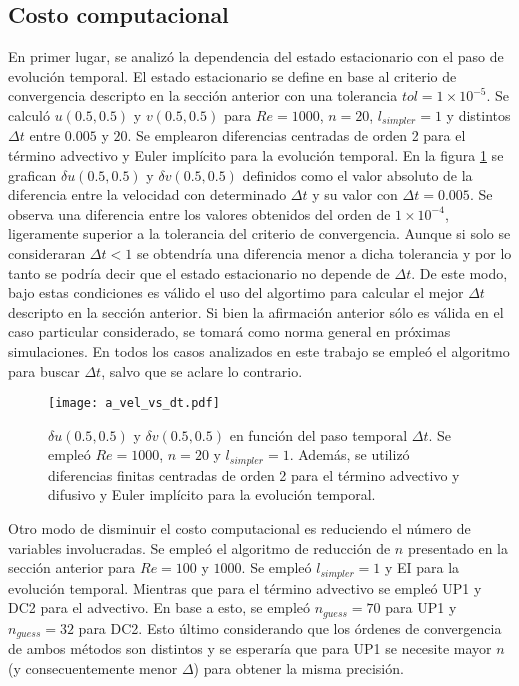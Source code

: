 \documentclass[aps,prb,twocolumn,superscriptaddress,floatfix,longbibliography,10pt]{revtex4-2}
\newif\ifptitle
\newif\ifpnumber
\newcounter{para}
\newcommand\ptitle[1]{\par\refstepcounter{para}
{\ifpnumber{\noindent\textcolor{lightgray}{\textbf{\thepara}}\indent}\fi}
{\ifptitle{\textbf{[{#1}]}}\fi}}
\begin{document}
\subsection{Costo computacional}

En primer lugar, se analizó la dependencia del estado estacionario con el paso de evolución temporal. El estado estacionario se define en base al criterio de convergencia descripto en la sección anterior con una tolerancia $tol = 1 \times 10^{-5}$. Se calculó $u(0.5,0.5)$ y $v(0.5,0.5)$ para $Re = 1000$, $n = 20$, $l_{simpler} = 1$ y distintos $\Delta t$ entre $0.005$ y $20$. Se emplearon diferencias centradas de orden 2 para el término advectivo y Euler implícito para la evolución temporal. En la figura \ref{fig:a_vel_vs_dt} se grafican $\delta u(0.5,0.5)$ y $\delta v(0.5,0.5)$ definidos como el valor absoluto de la diferencia entre la velocidad con determinado $\Delta t$ y su valor con $\Delta t = 0.005$. Se observa una diferencia entre los valores obtenidos del orden de $1 \times 10^{-4}$, ligeramente superior a la tolerancia del criterio de convergencia. Aunque si solo se consideraran $\Delta t < 1$ se obtendría una diferencia menor a dicha tolerancia y por lo tanto se podría decir que el estado estacionario no depende de $\Delta t$. De este modo, bajo estas condiciones es válido el uso del algortimo para calcular el mejor $\Delta t$ descripto en la sección anterior. Si bien la afirmación anterior sólo es válida en el caso particular considerado, se tomará como norma general en próximas simulaciones. En todos los casos analizados en este trabajo se empleó el algoritmo para buscar $\Delta t$, salvo que se aclare lo contrario.

\begin{figure}[h]
  \texttt{[image: a\_vel\_vs\_dt.pdf]}
  \caption{$\delta u(0.5,0.5)$ y $\delta v(0.5,0.5)$ en función del paso temporal $\Delta t$. Se empleó $Re = 1000$, $n = 20$ y $l_{simpler} = 1$. Además, se utilizó diferencias finitas centradas de orden 2 para el término advectivo y difusivo y Euler implícito para la evolución temporal.}
   \label{fig:a_vel_vs_dt}
\end{figure}

\ptitle{Resumen}
Otro modo de disminuir el costo computacional es reduciendo el número de variables involucradas. Se empleó el algoritmo de reducción de $n$ presentado en la sección anterior para $Re = 100$ y $1000$. Se empleó $l_{simpler} = 1$ y EI para la evolución temporal. Mientras que para el término advectivo se empleó UP1 y DC2 para el advectivo. En base a esto, se empleó $n_{guess} = 70$ para UP1 y $n_{guess} = 32$ para DC2. Esto último considerando que los órdenes de convergencia de ambos métodos son distintos y se esperaría que para UP1 se necesite mayor $n$ (y consecuentemente menor $\Delta$) para obtener la misma precisión.
\end{document}
